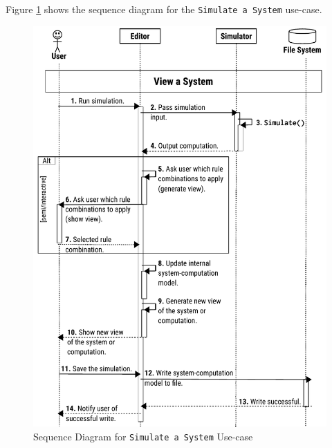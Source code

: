 \documentclass{article}
\begin{document}
Figure \ref{fig:sequence-simulate} shows the sequence diagram for the \texttt{Simulate a System} 
use-case.

\begin{figure}[H]
\begin{center}
\includegraphics[scale=0.90]{figures/zzz-sequence-simulate.pdf}
\caption{Sequence Diagram for \texttt{Simulate a System} Use-case}
\label{fig:sequence-simulate}
\end{center}
\end{figure}
\end{document}
